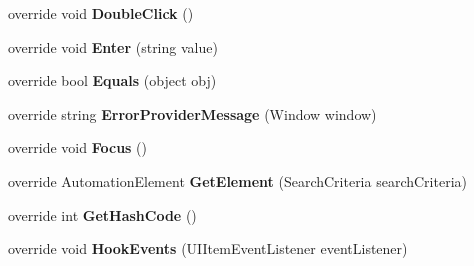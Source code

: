 \begin{DoxyCompactItemize}
\item 
\hypertarget{class_proto_test_1_1_golem_1_1_white_1_1_elements_1_1_white_label_a95f45f50468d0a5c2a09837183afb9f2}{override void {\bfseries Double\-Click} ()}\label{class_proto_test_1_1_golem_1_1_white_1_1_elements_1_1_white_label_a95f45f50468d0a5c2a09837183afb9f2}

\item 
\hypertarget{class_proto_test_1_1_golem_1_1_white_1_1_elements_1_1_white_label_adc0bc84e275864fd075a21239f23984e}{override void {\bfseries Enter} (string value)}\label{class_proto_test_1_1_golem_1_1_white_1_1_elements_1_1_white_label_adc0bc84e275864fd075a21239f23984e}

\item 
\hypertarget{class_proto_test_1_1_golem_1_1_white_1_1_elements_1_1_white_label_a5d68ab10eac4c87d8337f7de1e21b1e4}{override bool {\bfseries Equals} (object obj)}\label{class_proto_test_1_1_golem_1_1_white_1_1_elements_1_1_white_label_a5d68ab10eac4c87d8337f7de1e21b1e4}

\item 
\hypertarget{class_proto_test_1_1_golem_1_1_white_1_1_elements_1_1_white_label_a541a73d5c1d63ba64e68416a77e29057}{override string {\bfseries Error\-Provider\-Message} (Window window)}\label{class_proto_test_1_1_golem_1_1_white_1_1_elements_1_1_white_label_a541a73d5c1d63ba64e68416a77e29057}

\item 
\hypertarget{class_proto_test_1_1_golem_1_1_white_1_1_elements_1_1_white_label_acca733cecda925f1ef22029df7a3e6b9}{override void {\bfseries Focus} ()}\label{class_proto_test_1_1_golem_1_1_white_1_1_elements_1_1_white_label_acca733cecda925f1ef22029df7a3e6b9}

\item 
\hypertarget{class_proto_test_1_1_golem_1_1_white_1_1_elements_1_1_white_label_aa91b9ad691f4e429bfbe22d69a46f22c}{override Automation\-Element {\bfseries Get\-Element} (Search\-Criteria search\-Criteria)}\label{class_proto_test_1_1_golem_1_1_white_1_1_elements_1_1_white_label_aa91b9ad691f4e429bfbe22d69a46f22c}

\item 
\hypertarget{class_proto_test_1_1_golem_1_1_white_1_1_elements_1_1_white_label_a443a43b7fc8171cb23050c4b0857d8ba}{override int {\bfseries Get\-Hash\-Code} ()}\label{class_proto_test_1_1_golem_1_1_white_1_1_elements_1_1_white_label_a443a43b7fc8171cb23050c4b0857d8ba}

\item 
\hypertarget{class_proto_test_1_1_golem_1_1_white_1_1_elements_1_1_white_label_ad6c2f84b0c2018aa406d43eca212f025}{override void {\bfseries Hook\-Events} (U\-I\-Item\-Event\-Listener event\-Listener)}\label{class_proto_test_1_1_golem_1_1_white_1_1_elements_1_1_white_label_ad6c2f84b0c2018aa406d43eca212f025}


\end{DoxyCompactItemize}

